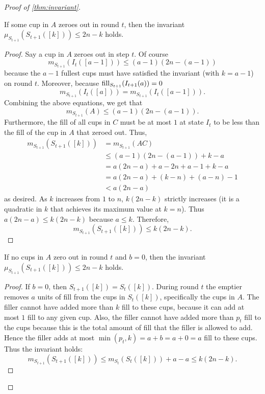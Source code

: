 \begin{proof}[Proof of \cref{thm:invariant}]
\begin{clm}
  If some cup in $A$ zeroes out in round $t$, then the invariant
  $\mu_{S_{t+1}}(S_{t+1}([k])) \le 2n-k$ holds.
\end{clm}
\begin{proof}
  Say a cup in $A$ zeroes out in step $t$. 
  Of course
  $$m_{S_{t+1}}(I_t([a-1])) \le (a-1)(2n-(a-1))$$
  because the $a-1$ fullest cups must have satisfied the invariant (with $k = a - 1$) on round
  $t$. Moreover, because $\operatorname{\text{\textup{fill}}}_{S_{t+1}}(I_{t+1}(a)) = 0$
  $$m_{S_{t+1}}(I_t([a])) = m_{S_{t+1}}(I_t([a-1])).$$
  Combining the above equations, we get that
  $$m_{S_{t+1}}(A) \le (a-1)(2n-(a-1)).$$
  Furthermore, the fill of all cups in $C$ must be at most $1$ at state $I_t$ to be
  less than the fill of the cup in $A$ that zeroed out. Thus, 
  \begin{align*}
      m_{S_{t+1}}(S_{t+1}([k])) & = m_{S_{t + 1}}(AC)\\ 
                                & \le (a-1)(2n-(a-1))+k-a\\
                                &= a(2n-a) +a -2n+a-1 + k -a\\
                                &= a(2n-a) + (k-n) + (a-n) -1\\
                                &< a(2n-a)
  \end{align*}
  as desired. As $k$ increases from $1$ to $n$, $k(2n-k)$ strictly increases (it is a
  quadratic in $k$ that achieves its maximum value at $k=n$).
  Thus $a(2n-a) \le k(2n-k)$ because $a\le k$.
  Therefore,
  $$m_{S_{t+1}}(S_{t+1}([k])) \le k(2n-k).$$
\end{proof}

\begin{clm}
  If no cups in $A$ zero out in round $t$ and $b=0$, then the invariant
  $\mu_{S_{t+1}}(S_{t+1}([k])) \le 2n-k$ holds.
\end{clm}
\begin{proof}
If $b=0$, then $S_{t+1}([k]) = S_t([k])$. 
During round $t$ the emptier removes $a$ units of fill from the cups in $S_t([k])$,
specifically the cups in $A$. The filler cannot have added more than $k$ fill
to these cups, because it can add at most $1$ fill to any given cup. Also, the
filler cannot have added more than $p_t$ fill to the cups because this is the
total amount of fill that the filler is allowed to add. Hence the filler adds
at most $\min(p_t, k) = a+b=a+0=a$ fill to these cups.
Thus the invariant holds:
$$m_{S_{t+1}}(S_{t+1}([k])) \le m_{S_t}(S_t([k]))+a-a \le k(2n-k).$$
\end{proof}


\end{proof}
